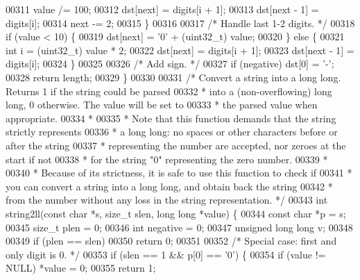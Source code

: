 \begin{DoxyCode}
00311         value /= 100;
00312         dst[next] = digits[i + 1];
00313         dst[next - 1] = digits[i];
00314         next -= 2;
00315     \}
00316 
00317     \textcolor{comment}{/* Handle last 1-2 digits. */}
00318     \textcolor{keywordflow}{if} (value < 10) \{
00319         dst[next] = \textcolor{stringliteral}{'0'} + (uint32\_t) value;
00320     \} \textcolor{keywordflow}{else} \{
00321         \textcolor{keywordtype}{int} i = (uint32\_t) value * 2;
00322         dst[next] = digits[i + 1];
00323         dst[next - 1] = digits[i];
00324     \}
00325 
00326     \textcolor{comment}{/* Add sign. */}
00327     \textcolor{keywordflow}{if} (negative) dst[0] = \textcolor{stringliteral}{'-'};
00328     \textcolor{keywordflow}{return} length;
00329 \}
00330 
00331 \textcolor{comment}{/* Convert a string into a long long. Returns 1 if the string could be parsed}
00332 \textcolor{comment}{ * into a (non-overflowing) long long, 0 otherwise. The value will be set to}
00333 \textcolor{comment}{ * the parsed value when appropriate.}
00334 \textcolor{comment}{ *}
00335 \textcolor{comment}{ * Note that this function demands that the string strictly represents}
00336 \textcolor{comment}{ * a long long: no spaces or other characters before or after the string}
00337 \textcolor{comment}{ * representing the number are accepted, nor zeroes at the start if not}
00338 \textcolor{comment}{ * for the string "0" representing the zero number.}
00339 \textcolor{comment}{ *}
00340 \textcolor{comment}{ * Because of its strictness, it is safe to use this function to check if}
00341 \textcolor{comment}{ * you can convert a string into a long long, and obtain back the string}
00342 \textcolor{comment}{ * from the number without any loss in the string representation. */}
00343 \textcolor{keywordtype}{int} string2ll(\textcolor{keyword}{const} \textcolor{keywordtype}{char} *s, size\_t slen, \textcolor{keywordtype}{long} \textcolor{keywordtype}{long} *value) \{
00344     \textcolor{keyword}{const} \textcolor{keywordtype}{char} *p = s;
00345     size\_t plen = 0;
00346     \textcolor{keywordtype}{int} negative = 0;
00347     \textcolor{keywordtype}{unsigned} \textcolor{keywordtype}{long} \textcolor{keywordtype}{long} v;
00348 
00349     \textcolor{keywordflow}{if} (plen == slen)
00350         \textcolor{keywordflow}{return} 0;
00351 
00352     \textcolor{comment}{/* Special case: first and only digit is 0. */}
00353     \textcolor{keywordflow}{if} (slen == 1 && p[0] == \textcolor{stringliteral}{'0'}) \{
00354         \textcolor{keywordflow}{if} (value != NULL) *value = 0;
00355         \textcolor{keywordflow}{return} 1;

\end{DoxyCode}
